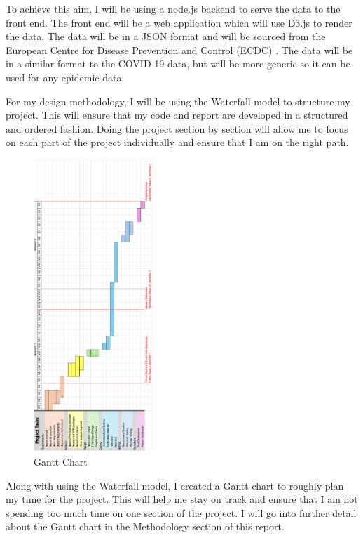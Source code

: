 \documentclass{report}
\begin{document}
To achieve this aim, I will be using a node.js backend to serve the data to the front end. The front end will be a web application which will use D3.js to render the data. The data will be in a JSON format and will be sourced from the European Centre for Disease Prevention and Control (ECDC) \cite{ecdc}. The data will be in a similar format to the COVID-19 data, but will be more generic so it can be used for any epidemic data.

For my design methodology, I will be using the Waterfall model to structure my project. This will ensure that my code and report are developed in a structured and ordered fashion. Doing the project section by section will allow me to focus on each part of the project individually and ensure that I am on the right path.
\newpage
\begin{center}
    \begin{figure}[h]
        \centering
        \includegraphics[width=0.4\textwidth, angle=270]{gantt_chart}
        \caption{Gantt Chart}
        \label{fig:gantt_chart}
    \end{figure}
\end{center}
Along with using the Waterfall model, I created a Gantt chart to roughly plan my time for the project. This will help me stay on track and ensure that I am not spending too much time on one section of the project. I will go into further detail about the Gantt chart in the Methodology section of this report.
\end{document}
